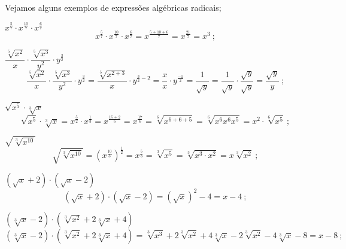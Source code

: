  Vejamos alguns exemplos de expressões algébricas radicais;
 
 \begin{exem}   
   $x^{\frac{5}{7}} \cdot x^{\frac{10}{7}} \cdot x^{\frac{6}{7}}$
\begin{equation*}
x^{\frac{5}{7}} \cdot x^{\frac{10}{7}} \cdot x^{\frac{6}{7}}= x^{\frac{5+10+6}{7}}= x^{\frac{21}{7}}= x^3 \ ;
\end{equation*}
    \end{exem}
 
 \begin{exem}
   $\dfrac{\sqrt[5]{x^2}}{x} \cdot \dfrac{\sqrt[5]{x^3}}{y^2} \cdot y^{\frac{3}{2}}$
\begin{equation*}
\dfrac{\sqrt[5]{x^2}}{x} \cdot \dfrac{\sqrt[5]{x^3}}{y^2} \cdot y^{\frac{3}{2}}= \dfrac{\sqrt[5]{x^{2+3}}}{x} \cdot y^{\frac{3}{2} - 2}= \dfrac{x}{x} \cdot y^{\frac{-1}{2}}= \dfrac{1}{\sqrt{y}}= \dfrac{1}{\sqrt{y}} \cdot \dfrac{\sqrt{y}}{\sqrt{y}}= \dfrac{\sqrt{y}}{y} \ ;
\end{equation*}
   \end{exem}
 
 \begin{exem}
    $\sqrt{x^5} \cdot \sqrt[3]{x}$
\begin{equation*}
\sqrt{x^5} \cdot \sqrt[3]{x}= x^{\frac{5}{2}} \cdot x^{\frac{1}{3}}= x^{\frac{15+2}{6}} = x^{\frac{17}{6}} = \sqrt[6]{x^{6+6+5}}= \sqrt[6]{x^6 x^6 x^5} =  x^2 \cdot \sqrt[6]{x^5} \ ;
\end{equation*}
   \end{exem}
 
 \begin{exem}
   $\sqrt{\sqrt[3]{x^{10}}}$
\begin{equation*}
\sqrt{\sqrt[3]{x^{10}}}= (x^{\frac{10}{3}})^{\frac{1}{2}}= x^{\frac{5}{3}}= \sqrt[3]{x^5}= \sqrt[3]{x^3 \cdot x^2}= x \sqrt[3]{x^2} \ ;
\end{equation*}
   \end{exem}
 
 \begin{exem}
    $(\sqrt{x} + 2) \cdot (\sqrt{x} - 2)$
\begin{equation*}
(\sqrt{x} + 2) \cdot (\sqrt{x} - 2)= (\sqrt{x})^2 - 4= x-4 \ ;
\end{equation*}
   \end{exem}
 
 \begin{exem}
  $(\sqrt[3]{x} - 2) \cdot (\sqrt[3]{x^2} + 2 \sqrt[3]{x} + 4)$
\begin{equation*}
(\sqrt[3]{x} - 2) \cdot (\sqrt[3]{x^2} + 2 \sqrt[3]{x} + 4)= \sqrt[3]{x^3} + 2\sqrt[3]{x^2} + 4 \sqrt[3]{x} - 2\sqrt[3]{x^2}- 4 \sqrt[3]{x} - 8= x - 8 \ ;
\end{equation*}
   \end{exem}
 
